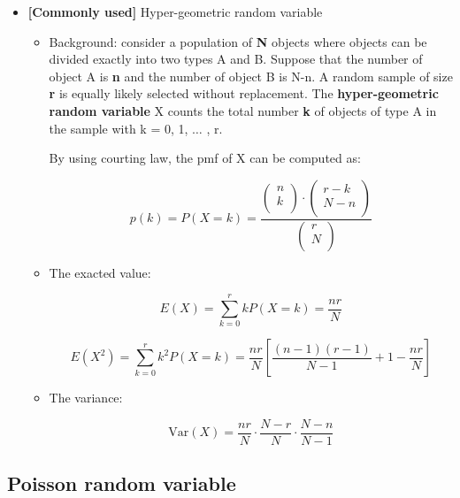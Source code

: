 \documentclass[12pt]{report}
\renewcommand{\_}{\kern-1.5pt\textunderscore\kern-1.5pt}
\begin{document}
\begin{itemize}
	\item \textbf{[Commonly used]} Hyper-geometric random variable\par

\begin{itemize}
	\item Background: consider a population of \textbf{N} objects where objects can be divided exactly into two types A and B. Suppose that the number of object A is \textbf{n} and the number of object B is N-n. A random sample of size \textbf{r} is equally likely selected without replacement. The \textbf{hyper-geometric random variable} X counts the total number \textbf{k} of objects of type A in the sample with k = 0, 1, $ \ldots $ , r.\par

By using courting law, the pmf of X can be computed as:\par

 \[ p \left( k \right) =P \left( X=k \right) =\frac{ \left( \begin{matrix}
n\\
k\\
\end{matrix}
 \right)  \cdot  \left( \begin{matrix}
r-k\\
N-n\\
\end{matrix}
 \right) }{ \left( \begin{matrix}
r\\
N\\
\end{matrix}
 \right) } \] \par

	\item The exacted value:\par

 \[ E \left( X \right) = \sum _{k=0}^{r}kP \left( X=k \right) =\frac{nr}{N} \] \par

 \[ E \left( X^{2} \right) = \sum _{k=0}^{r}k^{2}P \left( X=k \right) =\frac{nr}{N} \left[ \frac{ \left( n-1 \right)  \left( r-1 \right) }{N-1}+1-\frac{nr}{N} \right]  \] \par

	\item The variance:\par

 \[ \mathrm{Var} \left( X \right) =\frac{nr}{N} \cdot \frac{N-r}{N} \cdot \frac{N-n}{N-1} \] \par


\end{itemize}
\end{itemize}\subsection*{Poisson random variable}
\end{document}
